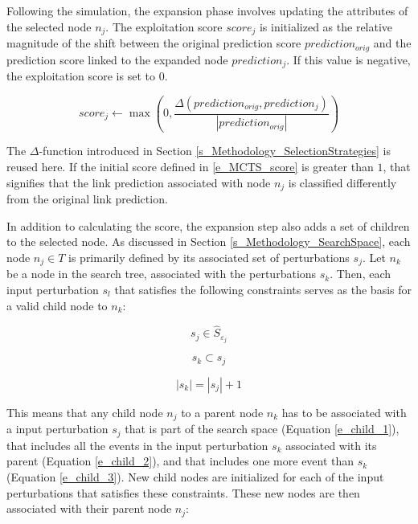 Following the simulation, the expansion phase involves updating the attributes of the selected node $n_j$. The exploitation score $score_j$ is initialized as the relative magnitude of the shift between the original prediction score $prediction_{orig}$ and the prediction score linked to the expanded node $prediction_j$. If this value is negative, the exploitation score is set to $0$. 

\begin{equation}
    \label{e_MCTS_score}
    score_j \gets \max\left(0, \frac{\Delta(prediction_{orig}, prediction_j)}{|prediction_{orig}|}\right)
\end{equation}

The $\Delta$-function introduced in Section \ref{s_Methodology_SelectionStrategies} is reused here. If the initial score defined in \ref{e_MCTS_score} is greater than $1$, that signifies that the link prediction associated with node $n_j$ is classified differently from the original link prediction.

In addition to calculating the score, the expansion step also adds a set of children to the selected node. As discussed in Section \ref{s_Methodology_SearchSpace}, each node $n_j \in T$ is primarily defined by its associated set of perturbations $s_j$. Let $n_k$ be a node in the search tree, associated with the perturbations $s_k$. Then, each input perturbation $s_l$ that satisfies the following constraints serves as the basis for a valid child node to $n_k$:

\begin{equation}
    \label{e_child_1}
    s_j \in \hat{S}_{\varepsilon_j}
\end{equation}

\begin{equation}
    \label{e_child_2}
    s_k \subset s_j
\end{equation}

\begin{equation}
    \label{e_child_3}
    |s_k| = |s_j| + 1
\end{equation}

This means that any child node $n_j$ to a parent node $n_k$ has to be associated with a input perturbation $s_j$ that is part of the search space (Equation \ref{e_child_1}), that includes all the events in the input perturbation $s_k$ associated with its parent (Equation \ref{e_child_2}), and that includes one more event than $s_k$ (Equation \ref{e_child_3}). New child nodes are initialized for each of the input perturbations that satisfies these constraints. These new nodes are then associated with their parent node $n_j$:



